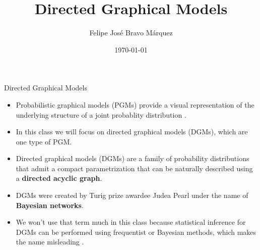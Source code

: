 \documentclass[handout]{beamer}
\title{Directed Graphical Models}
\author[Felipe Bravo Márquez]{\footnotesize
 \textcolor[rgb]{0.00,0.00,1.00}{Felipe José Bravo Márquez}}
\date{ \today }
\begin{document}
\begin{frame}
\titlepage


\end{frame}




\begin{frame}{Directed Graphical Models}
\scriptsize{
\begin{itemize}
\item Probabilistic graphical models (PGMs) provide a visual representation of the underlying structure of a joint probablity distribution \cite{ruozzi}.


\item In this class we will focus on directed graphical models (DGMs), which are one type of PGM.

\item Directed graphical models (DGMs) are a family of probability distributions that admit a compact parametrization that can be naturally described using a \textbf{directed acyclic graph}.

\item DGMs were created by Turig prize awardee Judea Pearl under the name of \textbf{Bayesian networks}.

\item We won't use that term much in this class because statistical inference for DGMs can be performed using frequentist or Bayesian methods, which makes the name misleading \cite{wasserman2013all}.


 
\end{itemize}



} 

\end{frame}
\end{document}
